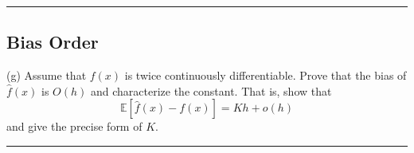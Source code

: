 \documentclass{article}
\newenvironment{colorparagraph}[1]{\par\color{#1}}{\par}
\begin{document}






\begin{colorparagraph}{questioncolor}
\label{q2g}
\rule{\textwidth}{0.5pt}
\subsection{Bias Order}
(g) Assume that \( f(x) \) is twice continuously differentiable. Prove that the bias of \( \hat{f}(x) \) is \( O(h) \) and characterize the constant. That is, show that
\[
\mathbb{E}[\hat{f}(x) - f(x)] = Kh + o(h)
\]
and give the precise form of \( K \).

\rule{\textwidth}{0.5pt}
\end{colorparagraph}
\end{document}
